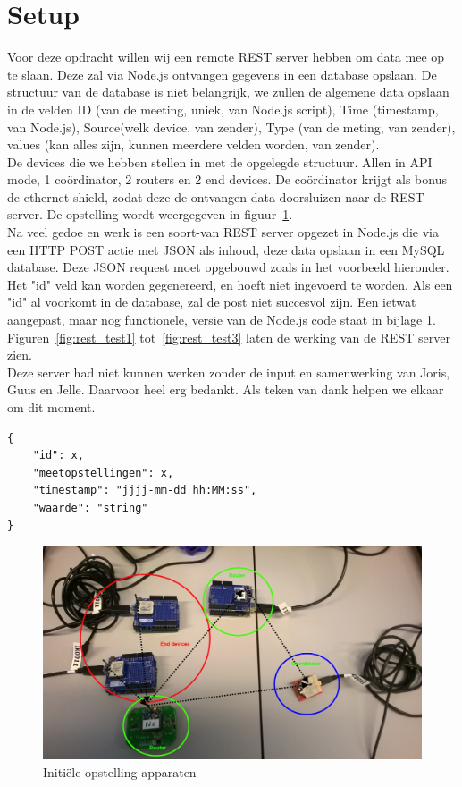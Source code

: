 \documentclass[12pt]{article}
\begin{document}
\clearpage

\section{Setup}

Voor deze opdracht willen wij een remote REST server hebben om data mee op te slaan. Deze zal via Node.js ontvangen gegevens in een database opslaan. De structuur van de database is niet belangrijk, we zullen de algemene data opslaan in de velden ID (van de meeting, uniek, van Node.js script), Time (timestamp, van Node.js), Source(welk device, van zender), Type (van de meting, van zender), values (kan alles zijn, kunnen meerdere velden worden, van zender). \\
De devices die we hebben stellen in met de opgelegde structuur. Allen in API mode, 1 coördinator, 2 routers en 2 end devices. De coördinator krijgt als bonus de ethernet shield, zodat deze de ontvangen data doorsluizen naar de REST server. De opstelling wordt weergegeven in figuur~\ref{fig:setup1}.\\
Na veel gedoe en werk is een soort-van REST server opgezet in Node.js die via een HTTP POST actie met JSON als inhoud, deze data opslaan in een MySQL database. Deze JSON request moet opgebouwd zoals in het voorbeeld hieronder. Het "id" veld kan worden gegenereerd, en hoeft niet ingevoerd te worden. Als een "id" al voorkomt in de database, zal de post niet succesvol zijn. Een ietwat aangepast, maar nog functionele, versie van de Node.js code staat in bijlage 1.\\
Figuren~\ref{fig:rest_test1} tot~\ref{fig:rest_test3} laten de werking van de REST server zien. \\
Deze server had niet kunnen werken zonder de input en samenwerking van Joris, Guus en Jelle. Daarvoor heel erg bedankt. Als teken van dank helpen we elkaar om dit moment. 
\begin{lstlisting}
{
	"id": x,
	"meetopstellingen": x,
	"timestamp": "jjjj-mm-dd hh:MM:ss",
	"waarde": "string"
}
\end{lstlisting}
\clearpage
\begin{figure}
\begin{center}
\includegraphics[scale=.4]{Test_Setup_1.jpg}
\caption{Initiële opstelling apparaten}
\label{fig:setup1}
\end{center}
\end{figure}
\end{document}
